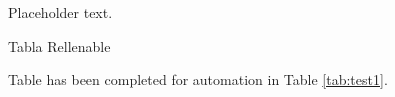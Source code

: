 \documentclass{article}
\begin{document}
        Placeholder text.

        \begin{table}[h]
            \begin{center}
                \caption{Tabla Rellenable}
                \label{tab:test1}
            \end{center}
        \end{table}

        Table has been completed for automation in Table \ref{tab:test1}.
        

    
\end{document}
